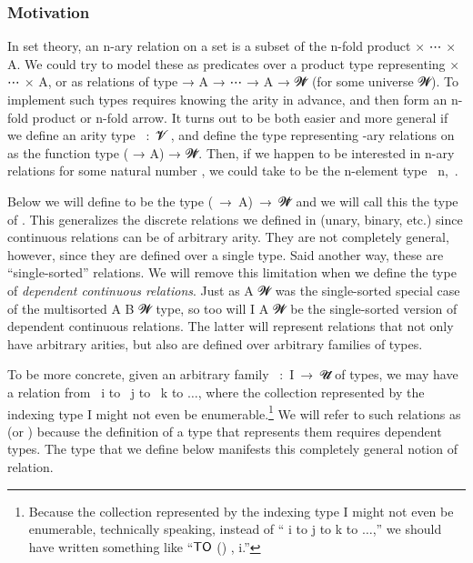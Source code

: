 \subsubsection{Motivation}\label{sec:motivation-1}
In set theory, an \ab n-ary relation on a set  is a subset of the \ab n-fold product  \ad × \as ⋯ \ad × \ab A. We could try to model these as predicates over a product type representing  \ad × \as ⋯ \ad × \ab A, or as relations of type  \as → \ab A \as → \as ⋯ \as → \ab A \as → \ab 𝓦\af ̇ (for some universe \ab 𝓦). To implement such types requires knowing the arity in advance, and then form an \ab n-fold product or \ab n-fold arrow. It turns out to be both easier and more general if we define an arity type ~\as :~\ab 𝓥\af ̇ , and define the type representing -ary relations on  as the function type ( \as → \ab A) \as → \ab 𝓦\af ̇. Then, if we happen to be interested in \ab n-ary relations for some natural number , we could take  to be the \ab n-element type ~\ab n,~\cite{agda-fin}.

Below we will define  to be the type (~\as →~\ab A)~\as →~\ab 𝓦\af ̇ and we will call this the type of . This generalizes the discrete relations we defined in  (unary, binary, etc.) since continuous relations can be of arbitrary arity.  They are not completely general, however, since they are defined over a single type. Said another way, these are ``single-sorted'' relations. We will remove this limitation when we define the type of \emph{dependent continuous relations}. Just as  \ab A \ab 𝓦 was the single-sorted special case of the multisorted  \ab A \ab B \ab 𝓦 type, so too will  \ab I \ab A \ab 𝓦 be the single-sorted version of dependent continuous relations. The latter will represent relations that not only have arbitrary arities, but also are defined over arbitrary families of types.

To be more concrete, given an arbitrary family ~\as :~\ab I~\as →~\ab 𝓤\af ̇ of types, we may have a relation from ~\ab i to ~\ab j to ~\ab k to $\ldots$, where the collection represented by the indexing type \ab I might not even be enumerable.\footnote{\label{uncountable}Because the collection represented by the indexing type \ab I might not even be enumerable, technically speaking, instead of `` \ab i to  \ab j to  \ab k to $\ldots$,'' we should have written something like ``$\mathsf{\af{TO}}$ () ,  \ab i.''}
We will refer to such relations as  (or ) because the definition of a type that represents them requires dependent types. The  type that we define below manifests this completely general notion of relation.

